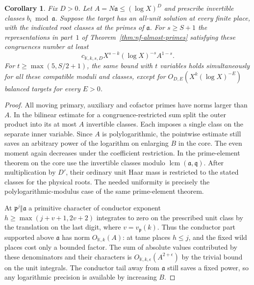 \documentclass[11pt,letterpaper]{article}
\newtheorem{corollary}[corollary]{Corollary}
\theoremstyle{definition}
\numberwithin{equation}{section}
\begin{document}
\begin{corollary}\label{cor:nf-prime-congruences}
Fix $D>0$. Let $A=N\mathfrak a\le(\log X)^D$ and prescribe
invertible classes $b_i\bmod\mathfrak a$. Suppose the target
has an all-unit solution at every finite place, with the indicated
root classes at the primes of $\mathfrak a$. For $s\ge S+1$ the
representations in part~$1$ of Theorem~\ref{thm:nf-almost-primes}
satisfying these congruences number at least
\[
       c_{\mathbb K,k,s,D}X^{s-k}(\log X)^{-s}A^{1-s}.
\]
For $t\ge\max(5,S/2+1)$, the same bound with $t$ variables holds
simultaneously for all these compatible moduli and classes, except
for $O_{D,E}(X^k(\log X)^{-E})$ balanced targets for every $E>0$.
\end{corollary}
\begin{proof}
All moving primary, auxiliary and cofactor primes have norms larger
than $A$. In the bilinear estimate for a congruence-restricted sum
split the outer product into its at most $A$ invertible classes.
Each imposes a single class on the separate inner variable. Since
$A$ is polylogarithmic, the pointwise estimate still saves an
arbitrary power of the logarithm on enlarging $B$ in the core.
The even moment again decreases under the coefficient restriction.
In the prime-element theorem on the core use the invertible
classes modulo $\operatorname{lcm}(\mathfrak a,\mathfrak q)$.
After multiplication by $D'$, their ordinary unit Haar mass is
restricted to the stated classes for the physical roots. The needed
uniformity is precisely the polylogarithmic-modulus case of the
same prime-element theorem.

At $\mathfrak p^j\Vert\mathfrak a$ a primitive character of
conductor exponent $h\ge\max(j+v+1,2v+2)$ integrates to zero
on the prescribed unit class by the translation on the last digit,
where $v=v_{\mathfrak p}(k)$. Thus the conductor part supported
above $\mathfrak a$ has norm $O_{\mathbb K,k}(A)$: at tame places
$h\le j$, and the fixed wild places cost only a bounded factor.
The sum of absolute values contributed by these denominators and
their characters is $O_{\mathbb K,k,\epsilon}(A^{2+\epsilon})$
by the trivial bound on the unit integrals. The conductor tail away
from $\mathfrak a$ still saves a fixed power, so any logarithmic
precision is available by increasing $B$.


\end{proof}
\end{document}
